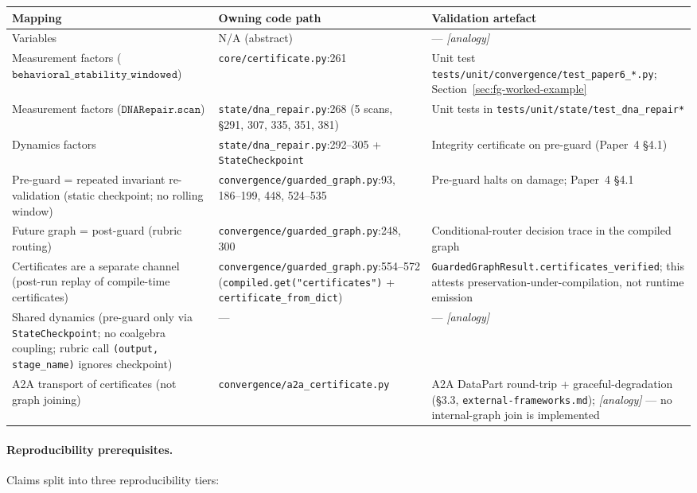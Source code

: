 \begin{center}
\small
\begin{tabular}{@{}p{3.6cm}p{5.8cm}p{4.4cm}@{}}
\toprule
Mapping & Owning code path & Validation artefact\\
\midrule
Variables & N/A (abstract) & --- \emph{[analogy]}\\[2pt]
Measurement factors ($\mathtt{behavioral\_stability\_windowed}$) &
\texttt{core/certificate.py}:261 &
Unit test \texttt{tests/unit/convergence/test\_paper6\_*.py};
Section~\ref{sec:fg-worked-example}\\[2pt]
Measurement factors ($\mathtt{DNARepair.scan}$) &
\texttt{state/dna\_repair.py}:268 (5 scans, \S291, 307, 335, 351, 381) &
Unit tests in \texttt{tests/unit/state/test\_dna\_repair*}\\[2pt]
Dynamics factors & \texttt{state/dna\_repair.py}:292--305 +
\texttt{StateCheckpoint} & Integrity certificate on pre-guard
(Paper~4 \S4.1)\\[2pt]
Pre-guard = repeated invariant re-validation (static checkpoint;
no rolling window) & \texttt{convergence/guarded\_graph.py}:93,
186--199, 448, 524--535 & Pre-guard halts on damage; Paper~4 \S4.1\\[2pt]
Future graph = post-guard (rubric routing) &
\texttt{convergence/guarded\_graph.py}:248, 300 &
Conditional-router decision trace in the compiled graph\\[2pt]
Certificates are a separate channel (post-run replay of
compile-time certificates) &
\texttt{convergence/guarded\_graph.py}:554--572
(\texttt{compiled.get("certificates")} +
\texttt{certificate\_from\_dict}) &
\texttt{GuardedGraphResult.certificates\_verified}; this attests
preservation-under-compilation, not runtime emission\\[2pt]
Shared dynamics (pre-guard only via \texttt{StateCheckpoint}; no
coalgebra coupling; rubric call \texttt{(output, stage\_name)}
ignores checkpoint) & --- & --- \emph{[analogy]}\\[2pt]
A2A transport of certificates (not graph joining) &
\texttt{convergence/a2a\_certificate.py} &
A2A DataPart round-trip + graceful-degradation (\S3.3,
\texttt{external-frameworks.md}); \emph{[analogy]} --- no
internal-graph join is implemented\\
\bottomrule
\end{tabular}
\end{center}

\paragraph{Reproducibility prerequisites.}
Claims split into three reproducibility tiers:

